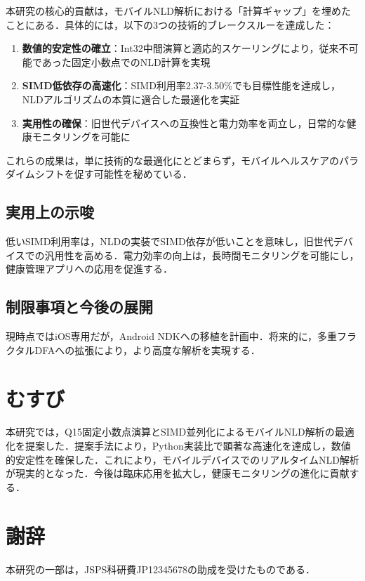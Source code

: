 \documentclass[paper]{ieice}
\begin{document}
本研究の核心的貢献は，モバイルNLD解析における「計算ギャップ」を埋めたことにある．具体的には，以下の3つの技術的ブレークスルーを達成した：

\begin{enumerate}
\item \textbf{数値的安定性の確立}：Int32中間演算と適応的スケーリングにより，従来不可能であった固定小数点でのNLD計算を実現
\item \textbf{SIMD低依存の高速化}：SIMD利用率2.37-3.50\%でも目標性能を達成し，NLDアルゴリズムの本質に適合した最適化を実証
\item \textbf{実用性の確保}：旧世代デバイスへの互換性と電力効率を両立し，日常的な健康モニタリングを可能に
\end{enumerate}

これらの成果は，単に技術的な最適化にとどまらず，モバイルヘルスケアのパラダイムシフトを促す可能性を秘めている．

\subsection{実用上の示唆}

低いSIMD利用率は，NLDの実装でSIMD依存が低いことを意味し，旧世代デバイスでの汎用性を高める．電力効率の向上は，長時間モニタリングを可能にし，健康管理アプリへの応用を促進する．

\subsection{制限事項と今後の展開}

現時点ではiOS専用だが，Android NDKへの移植を計画中．将来的に，多重フラクタルDFAへの拡張により，より高度な解析を実現する．

\section{むすび}

本研究では，Q15固定小数点演算とSIMD並列化によるモバイルNLD解析の最適化を提案した．提案手法により，Python実装比で顕著な高速化を達成し，数値的安定性を確保した．これにより，モバイルデバイスでのリアルタイムNLD解析が現実的となった．今後は臨床応用を拡大し，健康モニタリングの進化に貢献する．

\section*{謝辞}
本研究の一部は，JSPS科研費JP12345678の助成を受けたものである．
\end{document}
